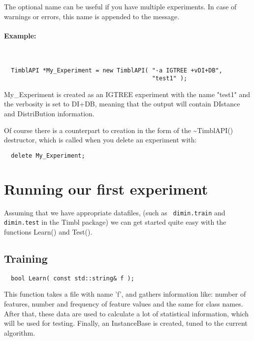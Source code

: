 The optional name can be useful if you have multiple experiments.
In case of warnings or errors, this name is appended to the message.\\

\paragraph{Example:}\ \\
\begin{verbatim}
  TimblAPI *My_Experiment = new TimblAPI( "-a IGTREE +vDI+DB", 
                                          "test1" );
\end{verbatim}

My\_Experiment is created as an IGTREE experiment with the name "test1"
and the verbosity is set to DI+DB, meaning that the output will
contain DIstance and DistriBution information.

Of course there is a counterpart to creation in the form of the 
\~{ }TimblAPI() destructor, which is called when you delete an
experiment with:

\begin{verbatim}
  delete My_Experiment;
\end{verbatim}

\section{Running our first experiment}

Assuming that we have appropriate datafiles, (such as {\tt
dimin.train} and {\tt dimin.test} in the Timbl package) we can get
started quite easy with the functions Learn() and Test().

\subsection{Training}
\begin{verbatim}
  bool Learn( const std::string& f );
\end{verbatim}

This function takes a file with name 'f', and gathers information
like: number of features, number and frequency of feature values and
the same for class names. \\
After that, these data are used to calculate a lot of statistical
information, which will be used for testing. Finally, an InstanceBase
is created, tuned to the current algorithm.\\ 

